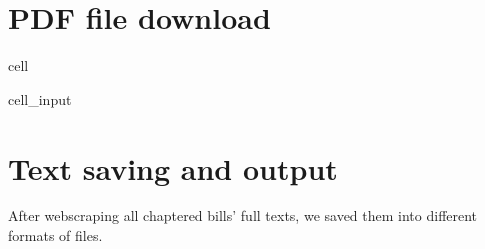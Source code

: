\documentclass[letterpaper,10pt,english]{jupyterBook}
\begin{document}
\section{PDF file download}
\label{\detokenize{ch20:pdf-file-download}}
\begin{sphinxuseclass}{cell}\begin{sphinxVerbatimInput}

\begin{sphinxuseclass}{cell_input}
\begin{sphinxVerbatim}[commandchars=\\\{\}]
   
       
                 
\end{sphinxVerbatim}

\end{sphinxuseclass}\end{sphinxVerbatimInput}

\end{sphinxuseclass}

\section{Text saving and output}
\label{\detokenize{ch20:text-saving-and-output}}
\sphinxAtStartPar
After webscraping all chaptered bills’ full texts, we saved them into different formats of files.
\end{document}
